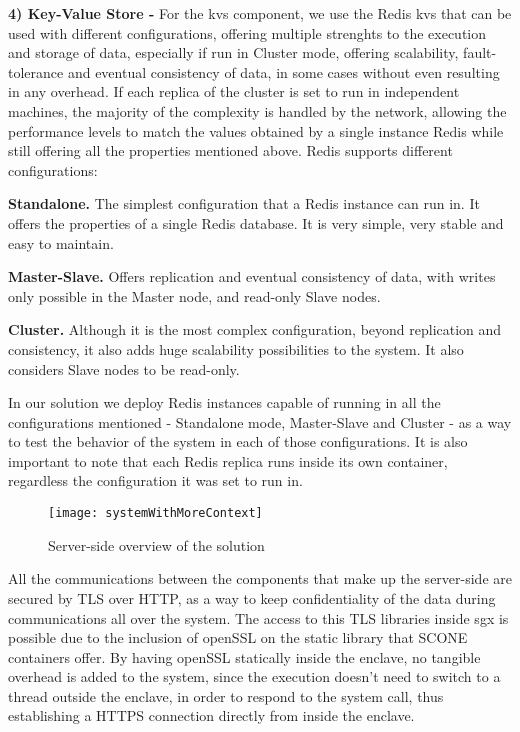 \textbf{4) Key-Value Store -}
For the \gls{kvs} component, we use the Redis \gls{kvs} that can be used with different configurations, offering multiple strenghts to the execution and storage of data, especially if run in Cluster mode, offering scalability, fault-tolerance and eventual consistency of data, in some cases without even resulting in any overhead. 
If each replica of the cluster is set to run in independent machines, the majority of the complexity is handled by the network, allowing the performance levels to match the values obtained by a single instance Redis while still offering all the properties mentioned above. Redis supports different configurations: 

\textbf{Standalone.} The simplest configuration that a Redis instance can run in. It offers the properties of a single Redis database. It is very simple, very stable and easy to maintain.

\textbf{Master-Slave.} Offers replication and eventual consistency of data, with writes only possible in the Master node, and read-only Slave nodes.

\textbf{Cluster.} Although it is the most complex configuration, beyond replication and consistency, it also adds huge scalability possibilities to the system. It also considers Slave nodes to be read-only.

In our solution we deploy Redis instances capable of running in all the configurations mentioned - Standalone mode, Master-Slave and Cluster - as a way to test the behavior of the system in each of those configurations. It is also important to note that each Redis replica runs inside its own container, regardless the configuration it was set to run in. 

\vspace{5mm}

\begin{figure}[htbp]
	\centering
	{\texttt{[image: systemWithMoreContext]}}
	\caption{Server-side overview of the solution}
	\label{fig:serverside_systemModel}
\end{figure}

\vspace{5mm}
All the communications between the components that make up the server-side are secured by TLS over HTTP, as a way to keep confidentiality of the data during communications all over the system. The access to this TLS libraries inside \gls{sgx} is possible due to the inclusion of openSSL on the static library that SCONE containers offer. By having openSSL statically inside the enclave, no tangible overhead is added to the system, since the execution doesn't need to switch to a thread outside the enclave, in order to respond to the system call, thus establishing a HTTPS connection directly from inside the enclave. 

